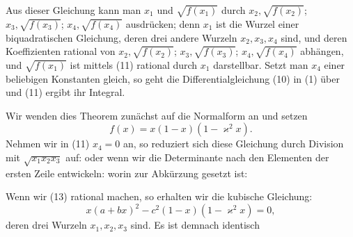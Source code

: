 
Aus dieser Gleichung kann man $x_1$ und $\sqrt{f(x_1)}$ 
durch $x_2, \sqrt{f(x_2)}$; $x_3, \sqrt{f(x_3)}$; $x_4, \sqrt{f(x_4)}$ ausdrücken; denn
$x_1$ ist die Wurzel einer biquadratischen Gleichung, deren drei
andere Wurzeln $x_2, x_3, x_4$ sind, und deren Koeffizienten rational
von $x_2, \sqrt{f(x_2)}$; $x_3, \sqrt{f(x_3)}$; $x_4, \sqrt{f(x_4)}$ abhängen, und $\sqrt{f(x_1)}$ ist
mittels (11) rational durch $x_1$ darstellbar. Setzt man $x_4$ einer
beliebigen Konstanten gleich, so geht die Differentialgleichung
(10) in (1) über und (11) ergibt ihr Integral.

Wir wenden dies Theorem zunächst auf die Normalform an
und setzen
\[ f(x) = x(1-x)(1-\varkappa^2 x). \]
Nehmen wir in (11) $x_4 = 0$ an, so reduziert sich diese
Gleichung durch Division mit $\sqrt{x_1 x_2 x_3}$ auf:
oder wenn wir die Determinante nach den Elementen der ersten
Zeile entwickeln:
worin zur Abkürzung gesetzt ist:

Wenn wir (13) rational machen, so erhalten wir die kubische
Gleichung:
\[ x(a+bx)^2 - c^2(1-x)(1-\varkappa^2 x) = 0, \]
deren drei Wurzeln $x_1, x_2, x_3$ sind. Es ist demnach identisch
